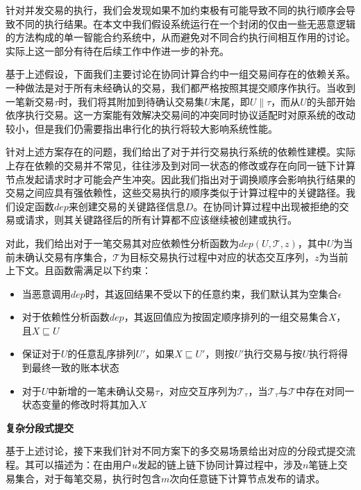 针对并发交易的执行，我们会发现如果不加约束极有可能导致不同的执行顺序会导致不同的执行结果。在本文中我们假设系统运行在一个封闭的仅由一些无恶意逻辑的方法构成的单一智能合约系统中，从而避免对不同合约执行间相互作用的讨论。实际上这一部分有待在后续工作中作进一步的补充。

基于上述假设，下面我们主要讨论在协同计算合约中一组交易间存在的依赖关系。一种做法是对于所有未经确认的交易，我们都严格按照其提交顺序作执行。当收到一笔新交易$\tau$时，我们将其附加到待确认交易集$U$末尾，即$U\parallel\tau$，而从$U$的头部开始依序执行交易。这一方案能有效解决交易间的冲突同时协议适配时对原系统的改动较小，但是我们仍需要指出串行化的执行将较大影响系统性能。

针对上述方案存在的问题，我们给出了对于并行交易执行系统的依赖性建模。实际上存在依赖的交易并不常见，往往涉及到对同一状态的修改或存在向同一链下计算节点发起请求时才可能会产生冲突。因此我们指出对于调换顺序会影响执行结果的交易之间应具有强依赖性，这些交易执行的顺序类似于计算过程中的关键路径。我们设定函数$dep$来创建交易的关键路径信息$D$。在协同计算过程中出现被拒绝的交易或请求，则其关键路径后的所有计算都不应该继续被创建或执行。

对此，我们给出对于一笔交易其对应依赖性分析函数为$dep(U, \mathcal{T}, z)$，其中$U$为当前未确认交易有序集合，$\mathcal{T}$为目标交易执行过程中对应的状态交互序列，$z$为当前上下文。且函数需满足以下约束：
\begin{itemize}
\setlength{\itemsep}{0pt}
\setlength{\parsep}{0pt}
\setlength{\parskip}{0pt}
    \item 当恶意调用$dep$时，其返回结果不受以下的任意约束，我们默认其为空集合$\epsilon$
    \item 对于依赖性分析函数$dep$，其返回值应为按固定顺序排列的一组交易集合$X$，且$X \sqsubseteq U$
    \item 保证对于$U$的任意乱序排列$U'$，如果$X \sqsubseteq U'$，则按$U'$执行交易与按$U$执行将得到最终一致的账本状态
    \item 对于$U$中新增的一笔未确认交易$\tau$，对应交互序列为$\mathcal{T}_\tau$，当$\mathcal{T}_\tau$与$\mathcal{T}$中存在对同一状态变量的修改时将其加入$X$
\end{itemize}

\noindent\textbf{复杂分段式提交}

基于上述讨论，接下来我们针对不同方案下的多交易场景给出对应的分段式提交流程。其可以描述为：在由用户$u$发起的链上链下协同计算过程中，涉及$n$笔链上交易集合，对于每笔交易，执行时包含$m$次向任意链下计算节点发布的请求。

